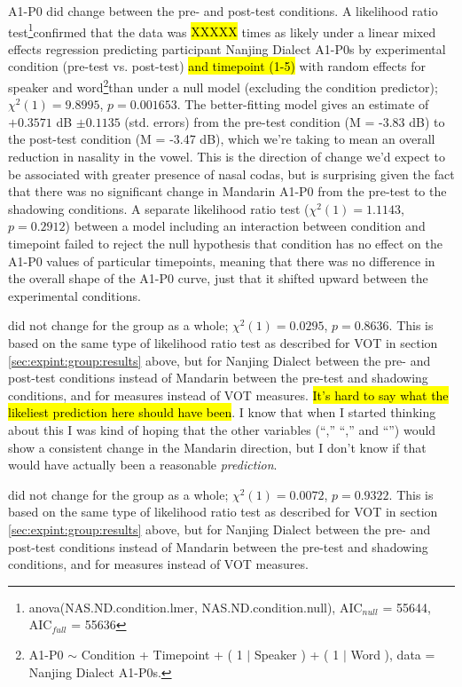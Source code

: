 A1-P0 did change between the pre- and post-test conditions. A likelihood ratio test\footnote{anova(NAS.ND.condition.lmer, NAS.ND.condition.null), AIC$_{null}$ = 55644, AIC$_{full}$ = 55636}confirmed that the data was \hl{XXXXX} times as likely under a linear mixed effects regression predicting participant Nanjing Dialect A1-P0s by experimental condition (pre-test vs. post-test) \hl{and timepoint (1-5)} with random effects for speaker and word\footnote{A1-P0 $\sim$ Condition + Timepoint + ( 1 $|$ Speaker ) + ( 1 $|$ Word ), data = Nanjing Dialect A1-P0s.}than under a null model (excluding the condition predictor); $\chi^2 (1) = 9.8995$, $p = 0.001653$. The better-fitting model gives an estimate of $+0.3571$ dB $\pm 0.1135$ (std. errors) from the pre-test condition (M = -3.83 dB) to the post-test condition (M = -3.47 dB), which we're taking to mean an overall reduction in nasality in the vowel. This is the direction of change we'd expect to be associated with greater presence of nasal codas, but is surprising given the fact that there was no significant change in Mandarin A1-P0 from the pre-test to the shadowing conditions. A separate likelihood ratio test ($\chi^2(1)=1.1143$, $p=0.2912$) between a model including an interaction between condition and timepoint failed to reject the null hypothesis that condition has no effect on the A1-P0 values of particular timepoints, meaning that there was no difference in the overall shape of the A1-P0 curve, just that it shifted upward between the experimental conditions.

\textipa{[e]/[iE]} did not change for the group as a whole; $\chi^2(1) = 0.0295$, $p = 0.8636$. This is based on the same type of likelihood ratio test as described for VOT in section \ref{sec:expint:group:results} above, but for Nanjing Dialect between the pre- and post-test conditions instead of Mandarin between the pre-test and shadowing conditions, and for \textipa{[e]/[iE]} measures instead of VOT measures. \hl{It's hard to say what the likeliest prediction here should have been}. I know that when I started thinking about this I was kind of hoping that the other variables (``\textipa{[e]/[iE]},'' ``\textipa{[I]/[y]},'' and ``\textipa{[l]/[n]}'') would show a consistent change in the Mandarin direction, but I don't know if that would have actually been a reasonable \textit{prediction}.

\textipa{[I]/[y]} did not change for the group as a whole; $\chi^2(1) = 0.0072$, $p = 0.9322$. This is based on the same type of likelihood ratio test as described for VOT in section \ref{sec:expint:group:results} above, but for Nanjing Dialect between the pre- and post-test conditions instead of Mandarin between the pre-test and shadowing conditions, and for \textipa{[I]/[y]} measures instead of VOT measures.

